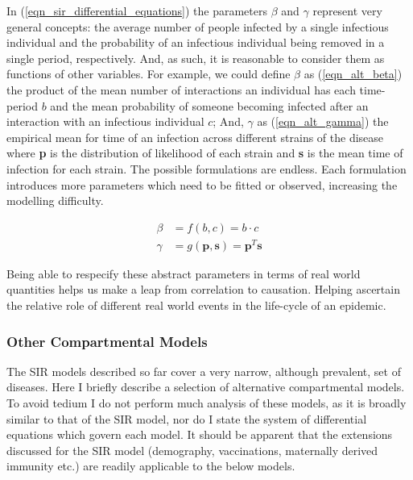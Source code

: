 \documentclass[11pt,a4paper]{article}
\theoremstyle{break}
\begin{document}
  \par In (\ref{eqn_sir_differential_equations}) the parameters $\beta$ and $\gamma$ represent very general concepts: the average number of people infected by a single infectious individual and the probability of an infectious individual being removed in a single period, respectively. And, as such, it is reasonable to consider them as functions of other variables. For example, we could define $\beta$ as (\ref{eqn_alt_beta}) the product of the mean number of interactions an individual has each time-period $b$ and the mean probability of someone becoming infected after an interaction with an infectious individual $c$; And, $\gamma$ as (\ref{eqn_alt_gamma}) the empirical mean for time of an infection across different strains of the disease where \textbf{p} is the distribution of likelihood of each strain and \textbf{s} is the mean time of infection for each strain. The possible formulations are endless. Each formulation introduces more parameters which need to be fitted or observed, increasing the modelling difficulty.

  \begin{subequations}\label{eqn_alt_parameters}
    \begin{alignat}{2}
      \beta&=f(b,c)=b\cdot c\label{eqn_alt_beta}\\
      \gamma&=g(\mathbf{p},\mathbf{s})=\mathbf{p}^T\mathbf{s}\label{eqn_alt_gamma}
    \end{alignat}
  \end{subequations}

  \par Being able to respecify these abstract parameters in terms of real world quantities helps us make a leap from correlation to causation. Helping ascertain the relative role of different real world events in the life-cycle of an epidemic.

\subsubsection{Other Compartmental Models}\label{sec_other_compartmental_models}

  \par The SIR models described so far cover a very narrow, although prevalent, set of diseases. Here I briefly describe a selection of alternative compartmental models. To avoid tedium I do not perform much analysis of these models, as it is broadly similar to that of the SIR model, nor do I state the system of differential equations which govern each model. It should be apparent that the extensions discussed for the SIR model (demography, vaccinations, maternally derived immunity etc.) are readily applicable to the below models.
\end{document}
